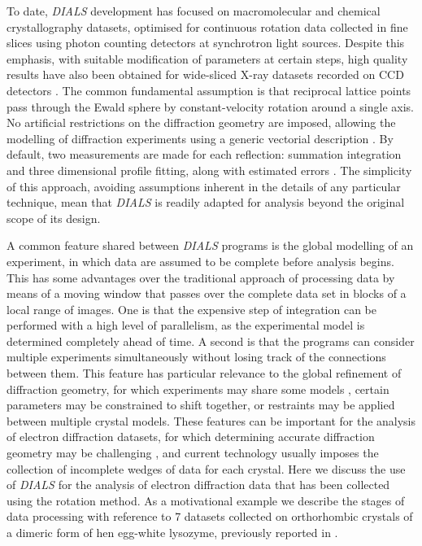 \documentclass[preprint]{iucr}
\newcommand{\dials}{\emph{DIALS}\xspace}
\begin{document}
To date, \dials development has focused on macromolecular and chemical
crystallography datasets, optimised for continuous rotation data collected in
fine slices using photon counting detectors at synchrotron light sources.
Despite this emphasis, with suitable modification of parameters at certain
steps, high quality results have also been obtained for wide-sliced X-ray
datasets recorded on CCD detectors \cite{dials_adsc:2016a,dials_adsc:2016b}. The common
fundamental assumption is that reciprocal lattice points pass through the Ewald
sphere by constant-velocity rotation around a single axis.
No artificial restrictions on the diffraction geometry are imposed, allowing the
modelling of diffraction experiments using a generic vectorial description
\cite{Waterman2016}. By default, two measurements are made for each reflection:
summation integration and three dimensional profile fitting, along with
estimated errors \cite{Winter2018}. The simplicity of this approach, avoiding
assumptions inherent in the details of any particular technique, mean that
\dials is readily adapted for analysis beyond the original scope of its design.

A common feature shared between \dials programs is the global modelling of an
experiment, in which data are assumed to be complete before analysis begins.
This has some advantages over the traditional approach of processing data by
means of a moving window that passes over the complete data set in blocks of a
local range of images. One is that the expensive step of integration can be
performed with a high level of parallelism, as the experimental model is
determined completely ahead of time. A second is that the programs can consider
multiple experiments simultaneously without losing track of the connections
between them. This feature has particular relevance to the global refinement of
diffraction geometry, for which experiments may share some models
\cite{Waterman2016}, certain parameters may be constrained to shift together,
or restraints may be applied between multiple crystal models. These features
can be important for the analysis of electron diffraction datasets, for which
determining accurate diffraction geometry may be challenging
\cite{review_adt_red:2015}, and current technology usually imposes the
collection of incomplete wedges of data for each crystal. Here we discuss the
use of \dials for the analysis of electron diffraction data that has been
collected using the rotation method. As a motivational example we describe the
stages of data processing with reference to 7 datasets collected on
orthorhombic crystals of a dimeric form of hen egg-white lysozyme, previously
reported in .
\end{document}
